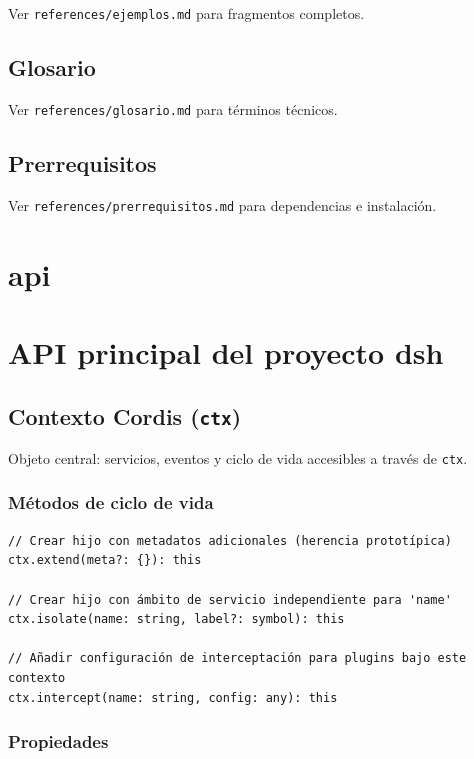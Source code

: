 \documentclass[11pt,a4paper]{article}
\begin{document}
Ver \texttt{references/ejemplos.md} para fragmentos completos.


\subsection*{Glosario}


Ver \texttt{references/glosario.md} para términos técnicos.


\subsection*{Prerrequisitos}


Ver \texttt{references/prerrequisitos.md} para dependencias e instalación.


\section*{api}

\section*{API principal del proyecto dsh}


\subsection*{Contexto Cordis (\texttt{ctx})}


Objeto central: servicios, eventos y ciclo de vida accesibles a través de \texttt{ctx}.


\subsubsection*{Métodos de ciclo de vida}


\begin{lstlisting}
// Crear hijo con metadatos adicionales (herencia prototípica)
ctx.extend(meta?: {}): this

// Crear hijo con ámbito de servicio independiente para 'name'
ctx.isolate(name: string, label?: symbol): this

// Añadir configuración de interceptación para plugins bajo este contexto
ctx.intercept(name: string, config: any): this
\end{lstlisting}


\subsubsection*{Propiedades}
\end{document}
